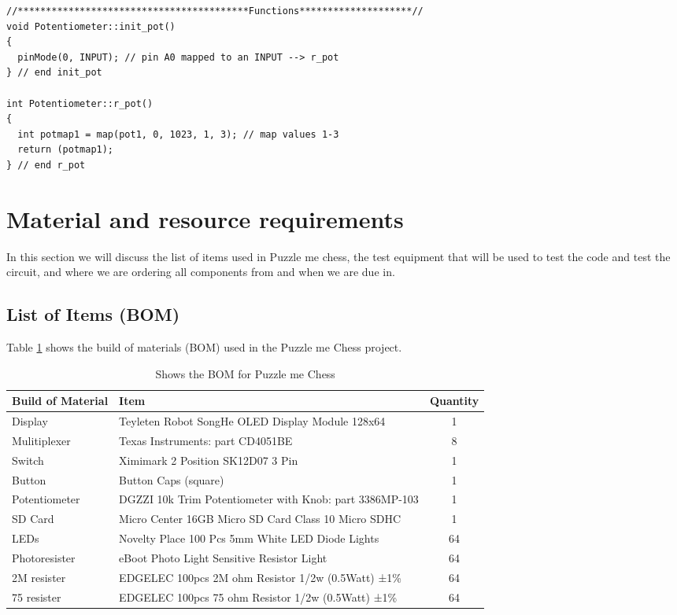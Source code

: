 \documentclass[11pt]{article}
\begin{document}
\begin{lstlisting}[caption={Puzzle me Chess - Photentiometer.cpp file},label={Photentiometer}]
//*****************************************Functions********************//
void Potentiometer::init_pot()
{
  pinMode(0, INPUT); // pin A0 mapped to an INPUT --> r_pot 
} // end init_pot

int Potentiometer::r_pot()
{
  int potmap1 = map(pot1, 0, 1023, 1, 3); // map values 1-3 
  return (potmap1);
} // end r_pot
\end{lstlisting}

\section{Material and resource requirements}
In this section we will discuss the list of items used in Puzzle me chess, the test equipment that will be used to test the code and test the circuit, and where we are ordering all components from and when we are due in. 

\subsection{List of Items (BOM)}
Table \ref{tab:BOM} shows the build of materials (BOM) used in the Puzzle me Chess project. 

\begin{table} 
\begin{center}
    \begin{tabular}{| l | l | c |}
    \hline
    Build of Material  & Item & Quantity \\ \hline
    Display & Teyleten Robot SongHe OLED Display Module 128x64 & 1 \\ \hline
    Mulitiplexer & Texas Instruments: part CD4051BE & 8 \\ \hline 
    Switch & Ximimark 2 Position SK12D07 3 Pin & 1 \\ \hline
    Button & Button Caps (square) & 1 \\ \hline
    Potentiometer & DGZZI 10k Trim Potentiometer with Knob: part 3386MP-103  & 1 \\ \hline
    SD Card & Micro Center 16GB Micro SD Card Class 10 Micro SDHC   & 1 \\ \hline
    LEDs & Novelty Place 100 Pcs 5mm White LED Diode Lights & 64\\ \hline
    Photoresister & eBoot  Photo Light Sensitive Resistor Light & 64\\ \hline
    2M resister & EDGELEC 100pcs 2M ohm Resistor 1/2w (0.5Watt) ±1\% & 64\\ \hline
    75 resister & EDGELEC 100pcs 75 ohm Resistor 1/2w (0.5Watt) ±1\%  & 64\\ \hline
    \end{tabular}
    \caption{Shows the BOM for Puzzle me Chess}
	\label{tab:BOM}
\end{center}
\end{table}
\end{document}
